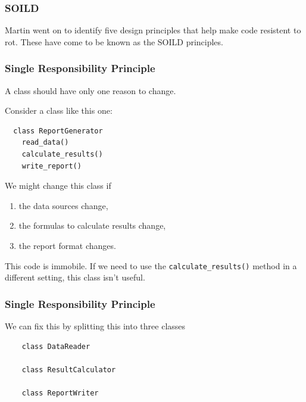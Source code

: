 \documentclass[10pt]{beamer}
\begin{document}
\begin{frame}
  \frametitle{SOILD}
  
  Martin went on to identify five design principles that help make code
  resistent to rot. These have come to be known as the SOILD principles.
  
    
\end{frame}

\begin{frame}[fragile]
  \frametitle{Single Responsibility Principle}
  
  A class should have only one reason to change.
  
  Consider a class like this one:
  
  \begin{verbatim}
  class ReportGenerator
    read_data()
    calculate_results()
    write_report()
  \end{verbatim}
  
  We might change this class if
  \begin{enumerate}
    \item the data sources change,
    \item the formulas to calculate results change,  
    \item the report format changes.
  \end{enumerate}
  
  This code is immobile. If we need to use the \texttt{calculate\_results()} method in a different setting, this class isn't useful.  
  
  
    
\end{frame}

\begin{frame}[fragile]
  \frametitle{Single Responsibility Principle}
  
  We can fix this by splitting this into three classes
  
  \begin{verbatim}
    class DataReader
    
    class ResultCalculator
    
    class ReportWriter
  \end{verbatim} 
    
\end{frame}
\end{document}
